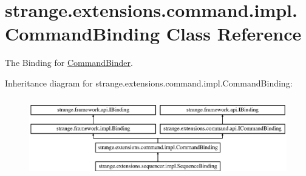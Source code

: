 \hypertarget{classstrange_1_1extensions_1_1command_1_1impl_1_1_command_binding}{\section{strange.\-extensions.\-command.\-impl.\-Command\-Binding Class Reference}
\label{classstrange_1_1extensions_1_1command_1_1impl_1_1_command_binding}
}


The Binding for \hyperlink{classstrange_1_1extensions_1_1command_1_1impl_1_1_command_binder}{Command\-Binder}.  


Inheritance diagram for strange.\-extensions.\-command.\-impl.\-Command\-Binding\-:\begin{figure}[H]
\begin{center}
\leavevmode
\includegraphics[height=3.544304cm]{classstrange_1_1extensions_1_1command_1_1impl_1_1_command_binding}
\end{center}
\end{figure}
